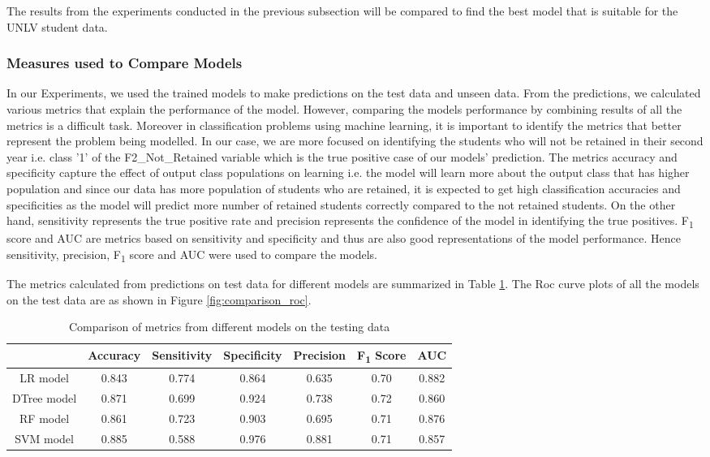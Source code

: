 \documentclass[11pt,openright]{report}
\begin{document}
The results from the experiments conducted in the previous subsection will be compared to find the best model that is suitable for the UNLV student data. 

\subsubsection {Measures used to Compare Models}

In our Experiments, we used the trained models to make predictions on the test data and unseen data. From the predictions, we calculated various metrics that explain the performance of the model. However, comparing the models performance by combining results of all the metrics is a difficult task. Moreover in classification problems using machine learning, it is important to identify the metrics that better represent the problem being modelled. In our case, we are more focused on identifying the students who will not be retained in their second year i.e. class '1' of the F2\_Not\_Retained variable which is the true positive case of our models' prediction. The metrics accuracy and specificity capture the effect of output class populations on learning i.e. the model will learn more about the output class that has higher population and since our data has more population of students who are retained, it is expected to get high classification accuracies and specificities as the model will predict more number of retained students correctly compared to the not retained students. On the other hand, sensitivity represents the true positive rate and precision represents the confidence of the model in identifying the true positives. F\textsubscript{1} score and AUC are metrics based on sensitivity and specificity and thus are also good representations of the model performance. Hence sensitivity, precision, F\textsubscript{1} score and AUC were used to compare the models.

The metrics calculated from predictions on test data for different models are summarized in Table \ref{table:compare_models_db}. The Roc curve plots of all the models on the test data are as shown in Figure \ref{fig:comparison_roc}.

\begin{table}[!htb]
	\renewcommand{\arraystretch}{1.3}
	\caption{Comparison of metrics from different models on the testing data}
	\label{table:compare_models_db}
	\centering
	\begin{tabular}{|c|c|c|c|c|c|c|}
    \hline
  	 & \bfseries Accuracy & \bfseries Sensitivity & \bfseries Specificity & \bfseries Precision & \bfseries F\textsubscript{1} Score  & \bfseries AUC\\  
    \hline
    	LR model & 0.843 & 0.774 & 0.864 & 0.635 & 0.70 & 0.882 \\ \hline
	DTree model & 0.871 & 0.699 & 0.924 & 0.738 & 0.72 & 0.860 \\ \hline
	RF model & 0.861 & 0.723 & 0.903 & 0.695 & 0.71 & 0.876 \\ \hline
	SVM model & 0.885 & 0.588 & 0.976 & 0.881 & 0.71 & 0.857 \\ \hline
	\end{tabular} 
\end{table}
\end{document}
